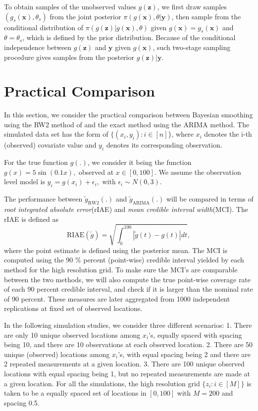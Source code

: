 \documentclass{article}
\begin{document}
To obtain samples of the unobserved values $g(\boldsymbol{z})$, we first draw samples $(g_s(\boldsymbol{x}), \theta_s)$ from the joint posterior $\pi(g(\boldsymbol{x}), \theta|\boldsymbol{y})$, then sample from the conditional distribution of $\pi(g(\boldsymbol{z})|g(\boldsymbol{x}), \theta)$ given $g(\boldsymbol{x}) = g_s(\boldsymbol{x})$ and $\theta = \theta_s$, which is defined by the prior distribution. Because of the conditional independence between $g(\boldsymbol{z})$ and $\boldsymbol{y}$ given $g(\boldsymbol{x})$, such two-stage sampling procedure gives samples from the posterior 
$g(\boldsymbol{z})|\boldsymbol{y}$.

\section{Practical Comparison}\label{practice}

In this section, we consider the practical comparison between Bayesian smoothing using the RW2 method of \cite{rw2} and the exact method using the ARIMA method. 
The simulated data set has the form of $\{(x_i,y_i):i\in[n]\}$, where $x_i$ denotes the i-th (observed) covariate value and $y_i$ denotes its corresponding observation. 

For the true function $g(.)$, we consider it being the function $g(x) = 5\sin(0.1x),$ observed at $x \in [0,100]$. We assume the observation level model is $y_i = g(x_i) + \epsilon_i, $ with $\epsilon_i \sim N(0,3)$.

The performance between $\tilde{g}_{\text{RW2}}(.)$ and $\tilde{g}_{\text{ARIMA}}(.)$ will be compared in terms of \textit{root integrated absolute error}(rIAE) and \textit{mean credible interval width}(MCI). The rIAE is defined as $$\text{RIAE}(\tilde{g}) = \sqrt{ \int_0^{100}|\tilde{g}(t)-g(t)|dt},$$ where the point estimate is defined using the posterior mean. The MCI is computed using the 90 \% percent (point-wise) credible interval yielded by each method for the high resolution grid. To make sure the MCI's are comparable between the two methods, we will also compute the true point-wise coverage rate of each 90 percent credible interval, and check if it is larger than the nominal rate of 90 percent. These measures are later aggregated from 1000 independent replications at fixed set of observed locations.

In the following simulation studies, we consider three different scenarios: 1. There are only 10 unique observed locations among $x_i$'s, equally spaced with spacing being 10, and there are 10 observations at each observed location. 2. There are 50 unique (observed) locations among $x_i$'s, with equal spacing being 2 and there are 2 repeated measurements at a given location. 3. There are 100 unique observed locations with equal spacing being 1, but no repeated measurements are made at a given location. For all the simulations, the high resolution grid $\{z_i: i\in [M] \}$ is taken to be a equally spaced set of locations in $[0,100]$ with $M = 200$ and spacing 0.5.
\end{document}
